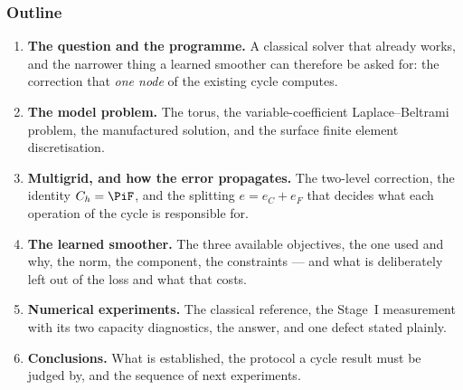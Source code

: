 \frametitle{Outline}
\small

\begin{enumerate}

    \item \textbf{The question and the programme.} A classical solver that already
    works, and the narrower thing a learned smoother can therefore be asked for: the
    correction that \emph{one node} of the existing cycle computes.

    \item \textbf{The model problem.} The torus, the variable-coefficient
    Laplace--Beltrami problem, the manufactured solution, and the surface finite element
    discretisation.

    \item \textbf{Multigrid, and how the error propagates.} The two-level correction, the
    identity $C_h = \PiF$, and the splitting $e = e_C + e_F$ that decides what each
    operation of the cycle is responsible for.

    \item \textbf{The learned smoother.} The three available objectives, the one used and
    why, the norm, the component, the constraints --- and what is deliberately left out of
    the loss and what that costs.

    \item \textbf{Numerical experiments.} The classical reference, the Stage~I
    measurement with its two capacity diagnostics, the answer, and one defect stated
    plainly.

    \item \textbf{Conclusions.} What is established, the protocol a cycle result must be
    judged by, and the sequence of next experiments.

\end{enumerate}
